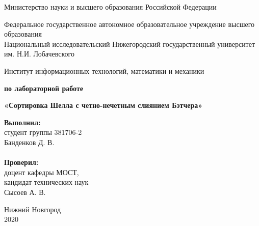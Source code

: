 \documentclass{report}
\begin{document}
\begin{titlepage}

\begin{center}
Министерство науки и высшего образования Российской Федерации
\end{center}

\begin{center}
Федеральное государственное автономное образовательное учреждение высшего образования \\
Национальный исследовательский Нижегородский государственный университет им. Н.И. Лобачевского
\end{center}

\begin{center}
Институт информационных технологий, математики и механики
\end{center}

\vspace{4em}

\begin{center}
\textbf{ по лабораторной работе} \\
\end{center}
\begin{center}
\textbf{\Large«Сортировка Шелла с четно-нечетным слиянием Бэтчера»} \\
\end{center}

\vspace{4em}

\newbox{\lbox}
\newlength{\maxl}
\setlength{\maxl}{\wd\lbox}
\hfill\parbox{7cm}{
\hspace*{5cm}\hspace*{-5cm}\textbf{Выполнил:} \\ студент группы 381706-2 \\ Банденков Д. В.\\
\\
\hspace*{5cm}\hspace*{-5cm}\textbf{Проверил:}\\ доцент кафедры МОСТ, \\ кандидат технических наук \\ Сысоев А. В.
}

\vspace{\fill}

\begin{center} Нижний Новгород \\ 2020 \end{center}

\end{titlepage}
\end{document}
